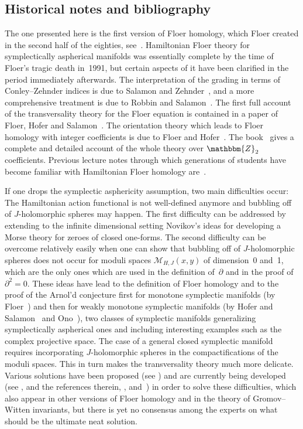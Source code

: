 \documentclass[12pt,twoside]{amsart}
\theoremstyle{plain}
\numberwithin{figure}{section}
\numberwithin{equation}{section}
\def\ZZ{\mathbbm{Z}}
\begin{document}
\subsection*{Historical notes and bibliography} 
The one presented here is the first version of Floer homology, which Floer created in the second half 
of the eighties, see~\cite{Flo88:index, Flo88:unreg, Flo89:hol, Flo89:Witten}. 
Hamiltonian Floer theory for symplectically aspherical manifolds was essentially complete by the time 
of Floer's tragic death in~1991, but certain aspects of it have been clarified in the period immediately afterwards. The interpretation of the grading in terms of Conley--Zehnder indices is due to Salamon and Zehnder~\cite{SaZe92}, and a more comprehensive treatment is due to Robbin and Salamon~\cite{RobSal95}. 
The first full account of the transversality theory for the Floer equation is contained in a paper of Floer, Hofer and Salamon~\cite{FHS:95}. The orientation theory which leads to Floer homology with integer coefficients is due to Floer and Hofer~\cite{FH:93}. The book~\cite{AuDa14} gives a complete and detailed account of the whole theory over $\ZZ_2$ coefficients. Previous lecture notes through which generations of students have become familiar with Hamiltonian Floer homology are~\cite{Sal99}.

If one drops the symplectic asphericity assumption, two main difficulties occur: The Hamiltonian action functional is not well-defined anymore and bubbling off of $J$-holomorphic spheres may happen. 
The first difficulty can be addressed by extending to the infinite dimensional setting Novikov's ideas 
for developing a Morse theory for zeroes of closed one-forms. The second difficulty can be overcome relatively easily when one can show that bubbling off of $J$-holomorphic spheres does not occur for moduli spaces $\mathcal{M}_{H,J}(x,y)$ of dimension~0 and~1, which are the only ones which are used in the definition of~$\partial$ and in the proof of $\partial^2=0$. 
These ideas have lead to the definition of Floer homology and to the proof of the Arnol'd conjecture 
first for monotone symplectic manifolds (by Floer~\cite{Flo89:hol}) and then for weakly monotone 
symplectic manifolds (by Hofer and Salamon~\cite{hs95} and Ono~\cite{ono95}), 
two classes of symplectic manifolds generalizing symplectically aspherical ones and including interesting examples such as the complex projective space. The case of a general closed symplectic manifold requires incorporating $J$-holomorphic spheres in the compactifications of the moduli spaces. 
This in turn makes the transversality theory much more delicate. Various solutions have been proposed 
(see \cite{lt98, fo99}) and are currently being developed 
(see \cite[Part~II]{FOOO}, \cite{Ho04, HWZ17} and the references therein, 
\cite{McWe17, McWe18}, and~\cite{Par16})
in order to solve these difficulties, which also appear in other versions of Floer homology and in 
the theory of Gromov--Witten invariants, 
but there is yet no consensus among the experts on what should be the ultimate neat solution. 
\end{document}
